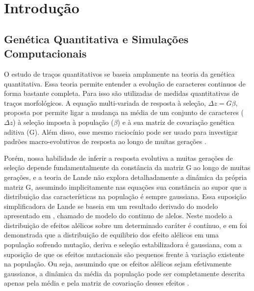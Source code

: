 \cleardoublepage
\pagestyle{fancy}

\chapter{Introdução}\label{intro}
\section{Genética Quantitativa e Simulações Computacionais}\label{intro:historico}

O estudo de traços quantitativos se baseia amplamente na teoria da
genética quantitativa. 
Essa teoria permite entender a evolução de caracteres continuos de forma
bastante completa. 
Para isso são utilizadas de medidas quantitativas de traços
morfológicos. 
A equação multi-variada de resposta à seleção, $\Delta z = G \beta$,
proposta por \cite{Lande1979} permite ligar a mudança na média de um
conjunto de caracteres ($\Delta z$) à seleção imposta à população
($\beta$) e à sua matriz de covariação genética aditiva (G). 
Além disso, esse mesmo raciocínio pode ser usado para investigar padrões
macro-evolutivos de resposta ao longo de muitas gerações
\citep{Lande1983, Marroig2004, Marroig2005}. 
 

Porém, nossa habilidade de inferir a resposta evolutiva a muitas
gerações de seleção depende fundamentalmente da constância da matriz G
ao longo de muitas gerações, e a teoria de Lande não explora
detalhadamente a dinâmica da própria matriz G, assumindo implicitamente
nas equações sua constância ao supor que a distribuição das
características na população é sempre gaussiana. 
Essa suposição simplificadora de Lande se baseia em um resultado
derivado do modelo apresentado em \cite{Crow1964}, chamado de modelo do
continuo de alelos. 
Neste modelo a distribuição de efeitos alélicos sobre um determinado
caráter é contínuo, e em \cite{Kimura1965} foi demonstrada que a
distribuição de equilibrio dos efeito alélicos em uma população sofrendo
mutação, deriva e seleção estabilizadora é gaussiana, com a suposição de
que os efeitos mutacionais são pequenos frente à variação existente na
população. 
Ou seja, assumindo que os efeitos alélicos sejam efetivamente
gaussianos, a dinâmica da média da população pode ser completamente
descrita apenas pela média e pela matriz de covariação desses efeitos
\citep{Barton1987}. 


